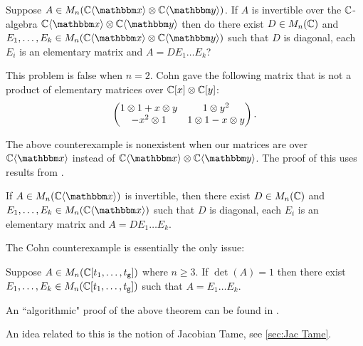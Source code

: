 
\begin{problem}
	Suppose $A\in M_n(\C\fralg{\bbx}\otimes \C\fralg{\bby})$. If $A$ is invertible over the $\mathbb{C}$-algebra $\C\fralg{\bbx}\otimes \C\fralg{\bby}$ then do there exist $D\in M_n(\mathbb{C})$ and $E_1,\dots, E_k\in M_n(\C\fralg{\bbx}\otimes \C\fralg{\bby})$ such that $D$ is diagonal, each $E_i$ is an elementary matrix and $A = DE_1\dots E_k$?
\end{problem}

\begin{remark}
	This problem is false when $n=2$. Cohn gave the following matrix that is not a product of elementary matrices over $\mathbb{C}[x]\otimes \mathbb{C}[y]$:
	\[
		\begin{pmatrix} 1\otimes 1 + x\otimes y & 1\otimes y^2 \\ -x^2\otimes 1 & 1\otimes 1 - x\otimes y \end{pmatrix}.
	\]
\end{remark}

The above counterexample is nonexistent when our matrices are over $\C\fralg{\bbx}$ instead of $\C\fralg{\bbx}\otimes \C\fralg{\bby}$. The proof of this uses results from \cite{Suslin-Cohn06}.

\begin{theorem}
	If $A\in M_n(\C\fralg{\bbx})$ is invertible, then there exist $D\in M_n(\mathbb{C})$ and $E_1,\dots, E_k\in M_n(\C\fralg{\bbx})$ such that $D$ is diagonal, each $E_i$ is an elementary matrix and $A = DE_1\dots E_k$.
\end{theorem}

The Cohn counterexample is essentially the only issue:

\begin{theorem}
	Suppose $A\in M_n(\mathbb{C}[t_1,\dots, t_{\texttt{g}}])$ where $n\geq 3$. If $\det(A) = 1$ then there exist $E_1,\dots, E_k\in M_n(\mathbb{C}[t_1,\dots, t_{\texttt{g}}])$ such that $A = E_1\dots E_k$.
\end{theorem}

An ``algorithmic" proof of the above theorem can be found in \cite{Suslin-PW95}.


\begin{remark}
	An idea related to this is the notion of Jacobian Tame, see \ref{sec:Jac Tame}.
\end{remark}


\begingroup
\renewcommand{\addcontentsline}[3]{}%
\renewcommand{\section}[2]{}%

